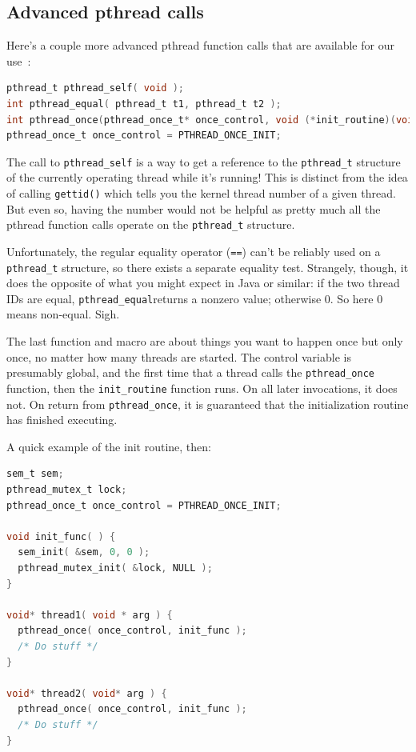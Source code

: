 \documentclass[a4paper]{report}
\begin{document}
\subsection*{Advanced pthread calls} Here's a couple more advanced pthread function calls that are available for our use~\cite{pthreads}:

\begin{lstlisting}[language=C]
pthread_t pthread_self( void );
int pthread_equal( pthread_t t1, pthread_t t2 );
int pthread_once(pthread_once_t* once_control, void (*init_routine)(void));
pthread_once_t once_control = PTHREAD_ONCE_INIT;
\end{lstlisting}

The call to \texttt{pthread\_self} is a way to get a reference to the \texttt{pthread\_t} structure of the currently operating thread while it's running! This is distinct from the idea of calling \texttt{gettid()} which tells you the kernel thread number of a given thread. But even so, having the number would not be helpful as pretty much all the pthread function calls operate on the \texttt{pthread\_t} structure.

Unfortunately, the regular equality operator (\texttt{==}) can't be reliably used on a \texttt{pthread\_t} structure, so there exists a separate equality test. Strangely, though, it does the opposite of what you might expect in Java or similar: if the two thread IDs are equal, \texttt{pthread\_equal}returns a nonzero value; otherwise 0. So here 0 means non-equal. Sigh.

The last function and macro are about things you want to happen once but only once, no matter how many threads are started. The control variable is presumably global, and the first time that a thread calls the \texttt{pthread\_once} function, then the \texttt{init\_routine} function runs. On all later invocations, it does not. On return from \texttt{pthread\_once}, it is guaranteed that the initialization routine has finished executing.

A quick example of the init routine, then:
\begin{lstlisting}[language=C]
sem_t sem;
pthread_mutex_t lock;
pthread_once_t once_control = PTHREAD_ONCE_INIT;

void init_func( ) {
  sem_init( &sem, 0, 0 );
  pthread_mutex_init( &lock, NULL );
}

void* thread1( void * arg ) {
  pthread_once( once_control, init_func );
  /* Do stuff */
}

void* thread2( void* arg ) {
  pthread_once( once_control, init_func );
  /* Do stuff */
}
\end{lstlisting}
\end{document}

